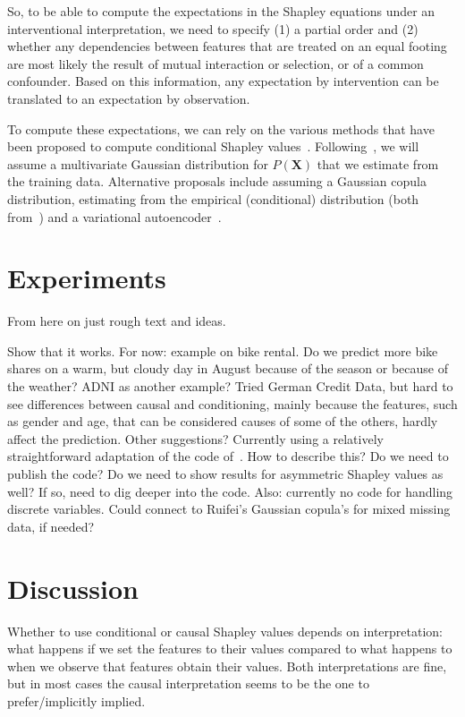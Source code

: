 \documentclass{article}
\newcommand{\vX}{\mathbf{X}}
\newcommand{\comment}[1]{{\color{red} #1}}
\begin{document}
So, to be able to compute the expectations in the Shapley equations under an interventional interpretation, we need to specify (1) a partial order and (2) whether any dependencies between features that are treated on an equal footing are most likely the result of mutual interaction or selection, or of a common confounder. Based on this information, any expectation by intervention can be translated to an expectation by observation.

To compute these expectations, we can rely on the various methods that have been proposed to compute conditional Shapley values~\cite{aas2019explaining,frye2019asymmetric}. Following~\cite{aas2019explaining}, we will assume a multivariate Gaussian distribution for $P(\vX)$ that we estimate from the training data. Alternative proposals include assuming a Gaussian copula distribution, estimating from the empirical (conditional) distribution (both from~\cite{aas2019explaining}) and a variational autoencoder~\cite{frye2019asymmetric}.

\section{Experiments}

\comment{From here on just rough text and ideas.}

Show that it works. For now: example on bike rental. Do we predict more bike shares on a warm, but cloudy day in August because of the season or because of the weather? \comment{ADNI as another example? Tried German Credit Data, but hard to see differences between causal and conditioning, mainly because the features, such as gender and age, that can be considered causes of some of the others, hardly affect the prediction. Other suggestions?} \comment{Currently using a relatively straightforward adaptation of the code of~\cite{aas2019explaining}. How to describe this? Do we need to publish the code? Do we need to show results for asymmetric Shapley values as well? If so, need to dig deeper into the code. Also: currently no code for handling discrete variables. Could connect to Ruifei's Gaussian copula's for mixed missing data, if needed?}

\section{Discussion}

Whether to use conditional or causal Shapley values depends on interpretation: what happens if we set the features to their values compared to what happens to when we observe that features obtain their values. Both interpretations are fine, but in most cases the causal interpretation seems to be the one to prefer/implicitly implied.
\end{document}
